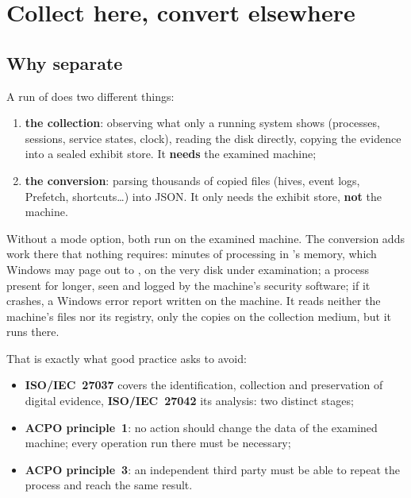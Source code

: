 \documentclass[11pt,a4paper,oneside]{report}
\begin{document}
\chapter{Collect here, convert elsewhere}\label{chap:separation}

\section{Why separate}

A run of \wac{} does two different things:
\begin{enumerate}
  \item \textbf{the collection}: observing what only a running system shows
        (processes, sessions, service states, clock), reading the disk
        directly, copying the evidence into a sealed exhibit store. It
        \textbf{needs} the examined machine;
  \item \textbf{the conversion}: parsing thousands of copied files (hives,
        event logs, Prefetch, shortcuts\ldots) into JSON. It only needs the
        exhibit store, \textbf{not} the machine.
\end{enumerate}

Without a mode option, both run on the examined machine. The conversion adds
work there that nothing requires: minutes of processing in \wac{}'s memory,
which Windows may page out to , on the very disk under
examination; a process present for longer, seen and logged by the machine's
security software; if it crashes, a Windows error report written on the
machine. It reads neither the machine's files nor its registry, only the copies
on the collection medium, but it runs there.

That is exactly what good practice asks to avoid:
\begin{itemize}
  \item \textbf{ISO/IEC~27037} covers the identification, collection and
        preservation of digital evidence, \textbf{ISO/IEC~27042} its analysis:
        two distinct stages;
  \item \textbf{ACPO principle~1}: no action should change the data of the
        examined machine; every operation run there must be necessary;
  \item \textbf{ACPO principle~3}: an independent third party must be able to
        repeat the process and reach the same result.
\end{itemize}
\end{document}
